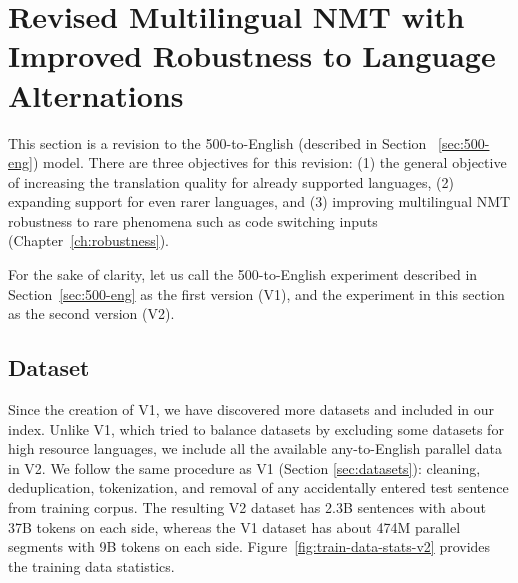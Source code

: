 \section{Revised Multilingual NMT with Improved Robustness to Language Alternations}

This section is a revision to the 500-to-English (described in Section ~\ref{sec:500-eng}) model.
There are three objectives for this revision: 
(1) the general objective of increasing the translation quality for already supported languages, 
(2) expanding support for even rarer languages,
and (3) improving multilingual NMT robustness to rare phenomena such as code switching inputs (Chapter~\ref{ch:robustness}). 

For the sake of clarity, let us call the 500-to-English experiment described in Section~\ref{sec:500-eng} as the first version (V1), and the experiment in this section as the second version (V2).  

\subsection{Dataset} 
Since the creation of V1, we have discovered more datasets and included in our \mtdata{} index.
Unlike V1, which tried to balance datasets by excluding some datasets for high resource languages, we include all the available any-to-English parallel data in V2.
We follow the same procedure as V1 (Section \ref{sec:datasets}): cleaning, deduplication, tokenization, and removal of any accidentally entered test sentence from training corpus. 
The resulting V2 dataset has 2.3B sentences with about 37B tokens on each side, whereas the V1 dataset has about 474M parallel segments with 9B tokens on each side. Figure~\ref{fig:train-data-stats-v2} provides the training data statistics. 

